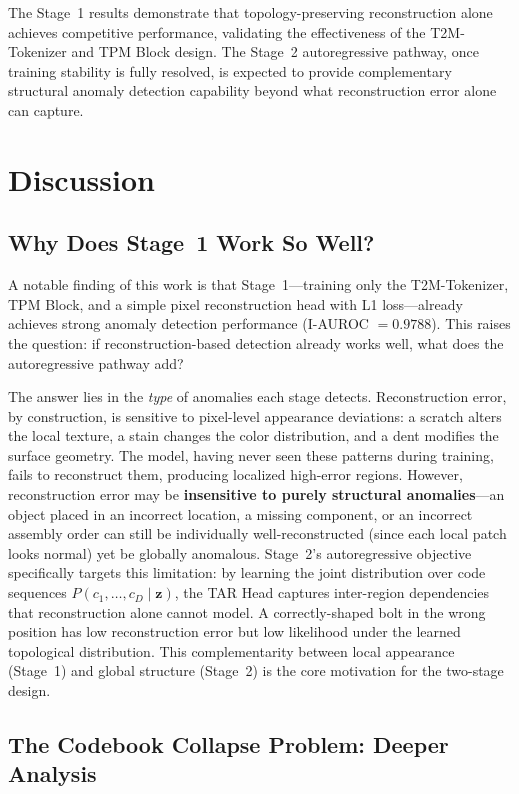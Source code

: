 \documentclass[lettersize,journal]{IEEEtran}
\begin{document}
The Stage~1 results demonstrate that topology-preserving reconstruction alone achieves competitive performance, validating the effectiveness of the T2M-Tokenizer and TPM Block design. The Stage~2 autoregressive pathway, once training stability is fully resolved, is expected to provide complementary structural anomaly detection capability beyond what reconstruction error alone can capture.


\section{Discussion}
\label{sec:discussion}

\subsection{Why Does Stage~1 Work So Well?}

A notable finding of this work is that Stage~1---training only the T2M-Tokenizer, TPM Block, and a simple pixel reconstruction head with L1 loss---already achieves strong anomaly detection performance (I-AUROC $= 0.9788$). This raises the question: if reconstruction-based detection already works well, what does the autoregressive pathway add?

The answer lies in the \textit{type} of anomalies each stage detects. Reconstruction error, by construction, is sensitive to pixel-level appearance deviations: a scratch alters the local texture, a stain changes the color distribution, and a dent modifies the surface geometry. The model, having never seen these patterns during training, fails to reconstruct them, producing localized high-error regions. However, reconstruction error may be \textbf{insensitive to purely structural anomalies}---an object placed in an incorrect location, a missing component, or an incorrect assembly order can still be individually well-reconstructed (since each local patch looks normal) yet be globally anomalous. Stage~2's autoregressive objective specifically targets this limitation: by learning the joint distribution over code sequences $P(c_1, \ldots, c_D \mid \mathbf{z})$, the TAR Head captures inter-region dependencies that reconstruction alone cannot model. A correctly-shaped bolt in the wrong position has low reconstruction error but low likelihood under the learned topological distribution. This complementarity between local appearance (Stage~1) and global structure (Stage~2) is the core motivation for the two-stage design.

\subsection{The Codebook Collapse Problem: Deeper Analysis}
\end{document}
